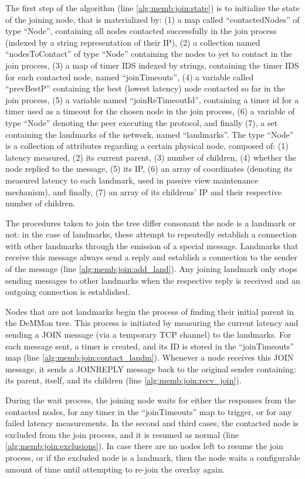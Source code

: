 The first step of the algorithm (line \ref{alg:memb:join:state}) is to initialize the state of the joining node, that is materialized by: (1) a map called ``contactedNodes'' of type ``Node'', containing all nodes contacted successfully in the join process (indexed by a string representation of their IP), (2) a collection named ``nodesToContact'' of type ``Node'' containing the nodes to yet to contact in the join process, (3) a map of timer IDS indexed by strings, containing the timer IDS for each contacted node, named ``joinTimeouts'', (4) a variable called ``prevBestP'' containing the best (lowest latency) node contacted so far in the join process, (5) a variable named ``joinReTimeoutId'', containing a timer id for a timer used as a timeout for the chosen node in the join process, (6) a variable of type ``Node'' denoting the peer executing the protocol, and finally (7), a set containing the landmarks of the network, named ``landmarks''. The type ``Node'' is a collection of attributes regarding a certain physical node, composed of: (1) latency measured, (2) its current parent, (3) number of children, (4) whether the node replied to the message, (5) its IP, (6) an array of coordinates (denoting its measured latency to each landmark, used in passive view maintenance mechanism), and finally, (7) an array of its childrens' IP and their respective number of children.
 
The procedures taken to join the tree differ consonant the node is a landmark or not: in the case of landmarks, these attempt to repeatedly establish a connection with other landmarks through the emission of a special message. Landmarks that receive this message always send a reply and establish a connection to the sender of the message (line \ref{alg:memb:join:add_land}). Any joining landmark only stops sending messages to other landmarks when the respective reply is received and an outgoing connection is established.

Nodes that are not landmarks begin the process of finding their initial parent in the DeMMon tree. This process is initiated by measuring the current latency and sending a JOIN message (via a temporary TCP channel) to the landmarks. For each message sent, a timer is created, and its ID is stored in the ``joinTimeouts'' map (line \ref{alg:memb:join:contact_landm}). Whenever a node receives this JOIN message, it sends a JOINREPLY message back to the original sender containing: its parent, itself, and its children (line \ref{alg:memb:join:recv_join}).

During the wait process, the joining node waits for either the responses from the contacted nodes, for any timer in the ``joinTimeouts'' map to trigger, or for any failed latency measurements. In the second and third cases, the contacted node is excluded from the join process, and it is resumed as normal (line \ref{alg:memb:join:exclusions}). In case there are no nodes left to resume the join process, or if the excluded node is a landmark, then the node waits a configurable amount of time until attempting to re-join the overlay again. 

